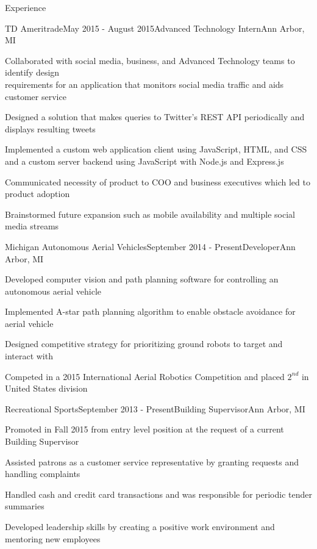 \documentclass{resume} %
\begin{document}
\begin{rSection}{Experience}

\begin{rSubsection}{TD Ameritrade}{May 2015 - August 2015}{Advanced Technology Intern}{Ann Arbor, MI}
    \item Collaborated with social media, business, and Advanced Technology teams to identify design \\
          requirements for an application that monitors social media traffic and aids customer service
    \item Designed a solution that makes queries to Twitter's REST API periodically and displays resulting tweets
    \item Implemented a custom web application client using JavaScript, HTML, and CSS and
          a custom server backend using JavaScript with Node.js and Express.js
    \item Communicated necessity of product to COO and business executives which led to product adoption 
    \item Brainstormed future expansion such as mobile availability and multiple social media streams
\end{rSubsection}


\begin{rSubsection}{Michigan Autonomous Aerial Vehicles}{September 2014 - Present}{Developer}{Ann Arbor, MI}
    \item Developed computer vision and path planning software for controlling an autonomous aerial vehicle
    \item Implemented A-star path planning algorithm to enable obstacle avoidance for aerial vehicle
    \item Designed competitive strategy for prioritizing ground robots to target and interact with
    \item Competed in a 2015 International Aerial Robotics Competition and placed $2^{nd}$ in United States division
\end{rSubsection}


\begin{rSubsection}{Recreational Sports}{September 2013 - Present}{Building Supervisor}{Ann Arbor, MI}
    \item Promoted in Fall 2015 from entry level position at the request of a current Building Supervisor
    \item Assisted patrons as a customer service representative by granting requests and handling complaints
    \item Handled cash and credit card transactions and was responsible for periodic tender summaries
    \item Developed leadership skills by creating a positive work environment and mentoring new employees
\end{rSubsection}

\end{rSection}
\end{document}
